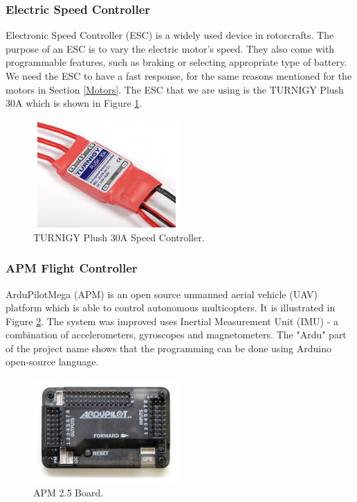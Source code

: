 \subsubsection{Electric Speed Controller}
Electronic Speed Controller (ESC) is a widely used device in rotorcrafts. The purpose of an ESC is to vary the electric motor's speed. They also come with programmable features, such as braking or selecting appropriate type of battery. We need the ESC to have a fast response, for the same reasons mentioned for the motors in Section \ref{Motors}. The ESC that we are using is the TURNIGY Plush 30A which is shown in Figure \ref{esc}.
 
\begin{figure}[H]
  \centering
    \includegraphics[width=0.5\textwidth]{images/esc.jpg}
	\caption{TURNIGY Plush 30A Speed Controller.}
	\label{esc}
\end{figure}

\subsubsection{APM Flight Controller}
ArduPilotMega (APM) is an open source unmanned aerial vehicle (UAV) platform which is able to control autonomous multicopters. It is illustrated in Figure \ref{ardupilot}. The system was improved uses Inertial Measurement Unit (IMU) - a combination of accelerometers, gyroscopes and magnetometers. The "Ardu" part of the project name shows that the programming can be done using Arduino open-source language.

\begin{figure}[H]
  \centering
    \includegraphics[width=0.5\textwidth]{images/ardupilot.jpg}
	\caption{APM 2.5 Board.}
	\label{ardupilot}
\end{figure}

